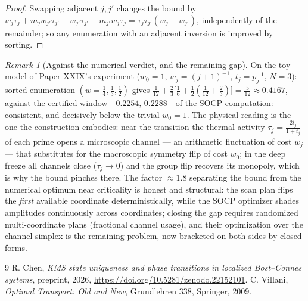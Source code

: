 \documentclass[11pt]{amsart}
\theoremstyle{remark}
\newtheorem{remark}[theorem]{Remark}
\begin{document}
\begin{proof}
Swapping adjacent $j,j'$ changes the bound by
$w_j\tau_j+m_j w_{j'}\tau_{j'}-w_{j'}\tau_{j'}-m_{j'}w_j\tau_j
=\tau_j\tau_{j'}(w_j-w_{j'})$, independently of the remainder; so any enumeration with an
adjacent inversion is improved by sorting.
\end{proof}

\begin{remark}[Against the numerical verdict, and the remaining gap]\label{rem:numerics}
On the toy model of Paper XXIX's experiment ($w_0=1$, $w_j=(j+1)^{-1}$,
$t_j=p_j^{-1}$, $N=3$): sorted enumeration $(w=\tfrac14,\tfrac13,\tfrac12)$ gives
$\tfrac1{12}+\tfrac23\bigl[\tfrac16+\tfrac12(\tfrac1{12}+\tfrac23)\bigr]
=\tfrac5{12}\approx0.4167$, against the certified window $[0.2254,\,0.2288]$ of the SOCP
computation: consistent, and decisively below the trivial $w_0=1$. The physical reading
is the one the construction embodies: near the transition the thermal activity
$\tau_j=\frac{2t_j}{1+t_j}$ of each prime opens a microscopic channel --- an arithmetic
fluctuation of cost $w_j$ --- that substitutes for the macroscopic symmetry flip of cost
$w_0$; in the deep freeze all channels close ($\tau_j\to0$) and the group flip recovers
its monopoly, which is why the bound pinches there. The factor $\approx1.8$ separating
the bound from the numerical optimum near criticality is honest and structural: the scan
plan flips the \emph{first} available coordinate deterministically, while the SOCP
optimizer shades amplitudes continuously across coordinates; closing the gap requires
randomized multi-coordinate plans (fractional channel usage), and their optimization over
the channel simplex is the remaining problem, now bracketed on both sides by closed
forms.
\end{remark}

\begin{thebibliography}{9}
 R. Chen, \emph{KMS state uniqueness and phase transitions in localized Bost--Connes systems}, preprint, 2026, \newline\url{https://doi.org/10.5281/zenodo.22152101}.
 C. Villani, \emph{Optimal Transport: Old and New}, Grundlehren 338, Springer, 2009.
\end{thebibliography}
\end{document}
